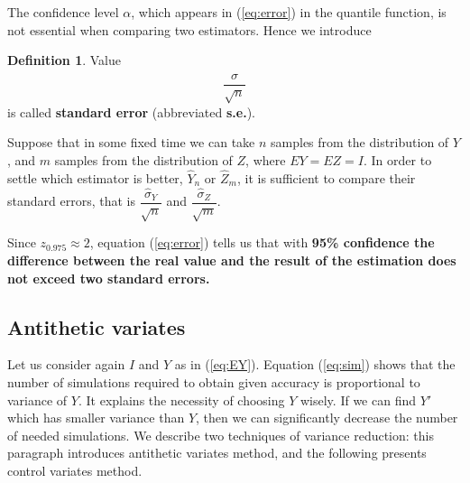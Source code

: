 \documentclass[a4paper,11pt, twoside]{book}
\theoremstyle{definition}
\newtheorem{mydef}{Definition}[chapter]
\theoremstyle{remark}
\begin{document}
The confidence level $\alpha$, which appears in (\ref{eq:error}) in the quantile function, is not essential when comparing two estimators. Hence we introduce 
\begin{mydef}
 Value
 \begin{equation}
  \label{eq:stderr}
  \frac{\hat{\sigma}}{\sqrt{n}}
 \end{equation}
is called \textbf{standard error} (abbreviated \textbf{s.e.}).
\end{mydef}
Suppose that in some fixed time we can take $n$ samples from the distribution of $Y$, and $m$ samples from the distribution of $Z$, where $EY = EZ = I$. In order to settle which estimator is better, $\hat{Y}_n$ or $\hat{Z}_m$, it is sufficient to compare their standard errors, that is $\dfrac{\hat{\sigma}_Y}{\sqrt{n}}$ and $\dfrac{\hat{\sigma}_Z}{\sqrt{m}}$.

Since $z_{0.975} \approx 2$, equation (\ref{eq:error}) tells us that with \textbf{95\% confidence the difference between the real value and the result of the estimation does not exceed two standard errors.}

\subsection{Antithetic variates}
Let us consider again $I$ and $Y$ as in (\ref{eq:EY}). Equation (\ref{eq:sim}) shows that the number of simulations required to obtain given accuracy is proportional to variance of $Y$. It explains the necessity of choosing $Y$ wisely. If we can find $Y'$ which has smaller variance than $Y$, then we can significantly decrease the number of needed simulations.
We describe two techniques of variance reduction: this paragraph introduces antithetic variates method, and the following presents control variates method.
\end{document}

